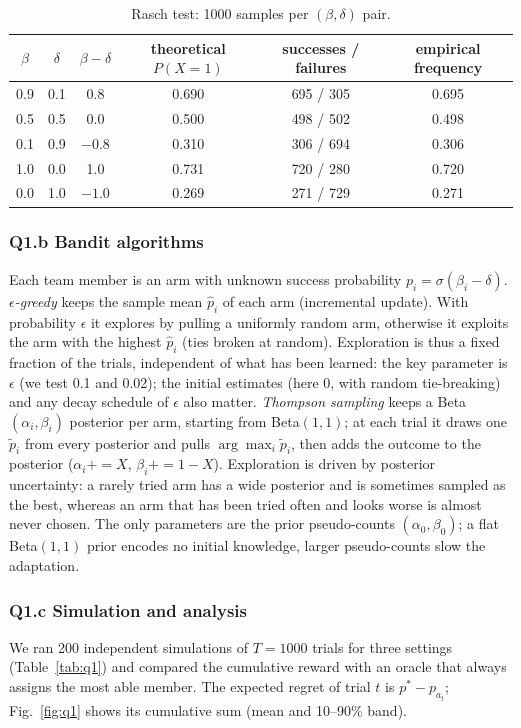 \documentclass[10pt,a4paper]{article}
\begin{document}
\begin{table}[!htb]
\centering\small
\caption{Rasch test: 1000 samples per $(\beta,\delta)$ pair.}
\label{tab:rasch}
\begin{tabular}{cccccc}
\toprule
$\beta$ & $\delta$ & $\beta-\delta$ & theoretical $P(X{=}1)$ & successes / failures & empirical frequency\\
\midrule
0.9 & 0.1 & 0.8 & 0.690 & 695 / 305 & 0.695\\
0.5 & 0.5 & 0.0 & 0.500 & 498 / 502 & 0.498\\
0.1 & 0.9 & $-0.8$ & 0.310 & 306 / 694 & 0.306\\
1.0 & 0.0 & 1.0 & 0.731 & 720 / 280 & 0.720\\
0.0 & 1.0 & $-1.0$ & 0.269 & 271 / 729 & 0.271\\
\bottomrule
\end{tabular}
\end{table}

\subsubsection{Q1.b Bandit algorithms} Each team member is an arm with unknown success probability $p_i=\sigma(\beta_i-\delta)$.
\emph{$\epsilon$-greedy} keeps the sample mean $\hat p_i$ of each arm (incremental update). With probability $\epsilon$ it explores by pulling a uniformly random arm, otherwise it exploits the arm with the highest $\hat p_i$ (ties broken at random). Exploration is thus a fixed fraction of the trials, independent of what has been learned: the key parameter is $\epsilon$ (we test 0.1 and 0.02); the initial estimates (here 0, with random tie-breaking) and any decay schedule of $\epsilon$ also matter.
\emph{Thompson sampling} keeps a Beta$(\alpha_i,\beta_i)$ posterior per arm, starting from Beta$(1,1)$; at each trial it draws one $\tilde p_i$ from every posterior and pulls $\arg\max_i \tilde p_i$, then adds the outcome to the posterior ($\alpha_i{+}{=}X$, $\beta_i{+}{=}1{-}X$). Exploration is driven by posterior uncertainty: a rarely tried arm has a wide posterior and is sometimes sampled as the best, whereas an arm that has been tried often and looks worse is almost never chosen. The only parameters are the prior pseudo-counts $(\alpha_0,\beta_0)$; a flat Beta$(1,1)$ prior encodes no initial knowledge, larger pseudo-counts slow the adaptation.

\subsubsection{Q1.c Simulation and analysis} We ran 200 independent simulations of $T=1000$ trials for three settings (Table~\ref{tab:q1}) and compared the cumulative reward with an oracle that always assigns the most able member. The expected regret of trial $t$ is $p^\ast-p_{a_t}$; Fig.~\ref{fig:q1} shows its cumulative sum (mean and 10--90\% band).
\end{document}
